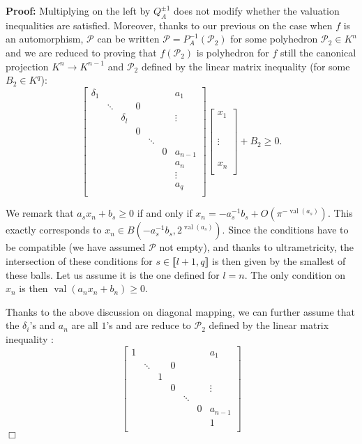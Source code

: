 \documentclass[a4paper,12pt]{article}
\newenvironment{proof}{\hbox{}\vspace{-0.5cm} {\bf Proof:}}{\hfill $\Box$ \\}
\newcommand{\PP}{\mathcal{P}}
\DeclareMathOperator{\val}{val}
\begin{document}
\begin{proof}
Multiplying on the left by $Q_A^{\pm 1}$ does not
modify whether the valuation inequalities are satisfied.
Moreover, thanks to our previous on the case when $f$ is an automorphism,
$\PP$ can be written
$\PP=P_A^{-1}(\PP_2)$ for some polyhedron $\PP_2 \in K^n$
and we are reduced to proving that
$f(\PP_2)$ is polyhedron for $f$ still the canonical projection
$K^n \rightarrow K^{n-1}$ and $\PP_2$
defined by the linear matrix inequality (for some $B_2 \in K^q$):
\[  \begin{bmatrix}
\delta_1	& 		& 			&   &		 &  &a_1	\\
			& \ddots& 			& 0	&		 &	&		\\
			&		& \delta_l  &   & 		 &	& \vdots\\
			&		&			&0  & 		 &	& 		\\
			&		&			&   & \ddots &	&		\\
			&		&			&	&		 & 0&a_{n-1} \\
			&		&			&	&		 &	&a_n 	\\
			&		&			&	&		 &	& \vdots   	\\
			&		&			&	&		 &	&a_q 	\\			
\end{bmatrix} \begin{bmatrix} x_1 \\ \\ \\ \\ \\ \vdots \\ \\ \\ \\ x_n \\ \end{bmatrix} + B_2 \geq 0.\]



We remark that 
$a_s x_n + b_s \geq 0$
if and only if $x_n = -a_s^{-1} b_s + O(\pi^{- \val(a_s)}).$
This exactly corresponds to $x_n \in B(-a_s^{-1} b_s, 2^{\val(a_s)}).$
Since the conditions have to be compatible (we have assumed
$\PP$ not empty), and thanks to ultrametricity,  
the intersection of these conditions for 
$s \in \llbracket l+1,q \rrbracket$
is then given by the smallest of these balls.
Let us assume it is the one defined for $l=n.$
The only condition on $x_n$
is then $\val(a_nx_n +b_n) \geq 0.$

Thanks to the above discussion on diagonal mapping,
we can further assume that the $\delta_i$'s and $a_n$ are all $1$'s
and are reduce to $\PP_2$ defined by the linear matrix inequality :
\[  \begin{bmatrix}
1	& 		& 			&   &		 &  &a_1	\\
			& \ddots& 			& 0	&		 &	&		\\
			&		& 1  &   & 		 &	& \\
			&		&			&0  & 		 &	& 	\vdots	\\
			&		&			&   & \ddots &	&		\\
			&		&			&	&		 & 0&a_{n-1} \\
			&		&			&	&		 &	&1 	\\
		

\end{bmatrix}\]
\end{proof}
\end{document}
